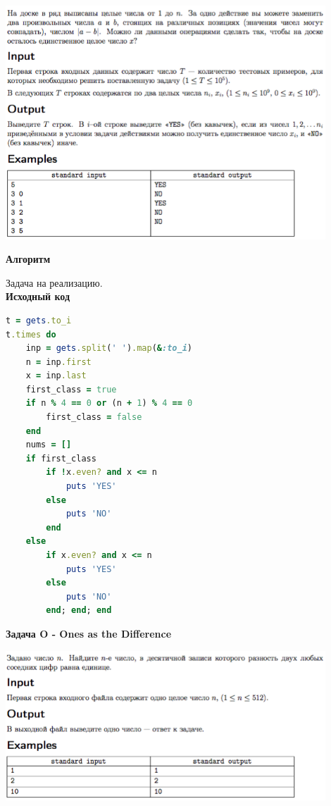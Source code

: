 \documentclass[a4paper,12pt]{article}
\begin{document}
\begin{center}
\includegraphics[width=0.9\textwidth]{OC_Bashkortostan/N.png}\\ [1cm]
\end{center}

\textbf{{\large Алгоритм}}

Задача на реализацию. \\

\textbf{{\large Исходный код}} \\
\begin{lstlisting}[language=Ruby]
t = gets.to_i
t.times do
    inp = gets.split(' ').map(&:to_i)
    n = inp.first
    x = inp.last
    first_class = true
    if n % 4 == 0 or (n + 1) % 4 == 0
        first_class = false
    end
    nums = []
    if first_class
        if !x.even? and x <= n
            puts 'YES'
        else
            puts 'NO'
        end
    else
        if x.even? and x <= n
            puts 'YES'
        else
            puts 'NO'
        end; end; end
\end{lstlisting}


\newpage
\textbf{{\large Задача O - Ones as the Difference}}

\begin{center}
\includegraphics[width=0.9\textwidth]{OC_Bashkortostan/O.png}\\ [1cm]
\end{center}
\end{document}
